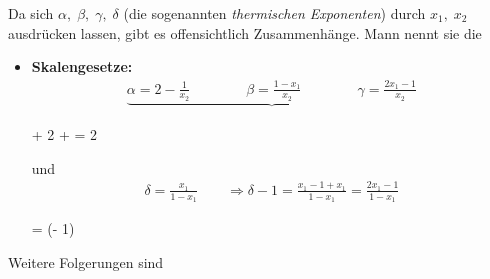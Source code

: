 \documentclass[12pt]{article}
\begin{document}
Da sich $\alpha, \; \beta, \; \gamma, \; \delta$ (die sogenannten \textit{thermischen Exponenten}) durch $x_1, \; x_2$ ausdrücken lassen, gibt es offensichtlich Zusammenhänge. Mann nennt sie die \\
\begin{itemize}
\item \textbf{Skalengesetze:}
\begin{align*}
\underbrace{\alpha = 2 - \frac{1}{x_2} \quad \quad \quad \quad \beta = \frac{1- x_1}{x_2} \quad \quad \quad \quad \gamma = \frac{2x_1 - 1}{x_2}} 
\end{align*}
\begin{tcolorbox}[ams gather,title= Rushbrooke-Gleichung, colback=blue!10!white, colframe=blue!30!black]  
\alpha + 2 \beta + \gamma = 2 
\end{tcolorbox}

und \begin{align*}
\delta= \frac{x_1}{1-x_1}  \quad \quad \Rightarrow \delta - 1 = \frac{x_1 - 1 + x_1}{1 - x_1} = \frac{2 x_1 - 1}{1 - x_1}
\end{align*}
\begin{tcolorbox}[ams gather,title= Widom-Gleichung, colback=blue!10!white, colframe=blue!30!black] 
\gamma = \beta \; (\delta - 1)
\end{tcolorbox}
\end{itemize}
Weitere Folgerungen sind
\end{document}
